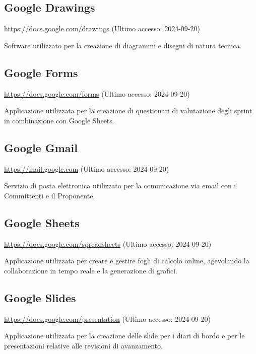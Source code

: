 \subsection{Google Drawings}
\par \href{https://docs.google.com/drawings}{https://docs.google.com/drawings} (Ultimo accesso: 2024-09-20)
\par Software utilizzato per la creazione di diagrammi e disegni di natura tecnica.

\subsection{Google Forms}
\par \href{https://docs.google.com/forms}{https://docs.google.com/forms} (Ultimo accesso: 2024-09-20)
\par Applicazione utilizzata per la creazione di questionari di valutazione degli sprint in combinazione con Google Sheets.

\subsection{Google Gmail}
\par \href{https://mail.google.com}{https://mail.google.com} (Ultimo accesso: 2024-09-20)
\par Servizio di posta elettronica utilizzato per la comunicazione via email con i Committenti e il Proponente.

\subsection{Google Sheets}
\par \href{https://docs.google.com/spreadsheets}{https://docs.google.com/spreadsheets} (Ultimo accesso: 2024-09-20)
\par Applicazione utilizzata per creare e gestire fogli di calcolo online, agevolando la collaborazione in tempo reale e la generazione di grafici.

\subsection{Google Slides}
\par \href{https://docs.google.com/presentation}{https://docs.google.com/presentation} (Ultimo accesso: 2024-09-20)
\par Applicazione utilizzata per la creazione delle slide per i diari di bordo e per le presentazioni relative alle revisioni di avanzamento.
    
